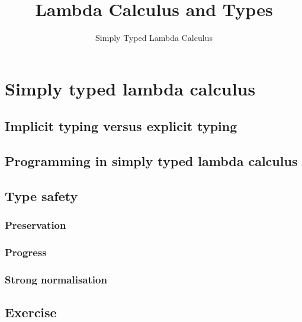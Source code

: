 \title{Lambda Calculus and Types}
\subtitle{Simply Typed Lambda Calculus}

\begin{frame}
\maketitle
\end{frame}

\section{Simply typed lambda calculus}
\subsection{Implicit typing versus explicit typing}
\subsection{Programming in simply typed lambda calculus}
\subsection{Type safety}
\subsubsection*{Preservation}
\subsubsection*{Progress}
\subsubsection*{Strong normalisation}
\subsection*{Exercise}



